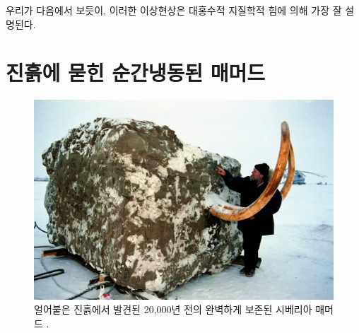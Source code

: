 \documentclass[10pt,twocolumn,letterpaper]{article}
\begin{document}
우리가 다음에서 보듯이, 이러한 이상현상은  대홍수적 지질학적 힘에 의해 가장 잘 설명된다.

\section{진흙에 묻힌 순간냉동된  매머드}

\begin{figure}[t]
\begin{center}
   \includegraphics[width=1\linewidth]{jarkov-mammoth.jpg}
\end{center}
   \caption{얼어붙은 진흙에서 발견된 20,000년 전의 완벽하게 보존된 시베리아 매머드 \cite{51}.}
\label{fig:1}
\label{fig:onecol}
\end{figure}
\end{document}
